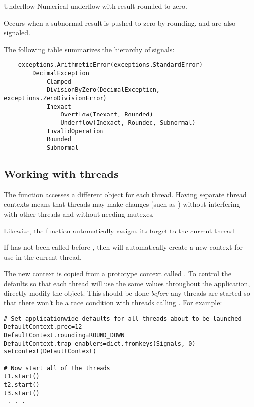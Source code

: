 \begin{classdesc*}{Underflow}
    Numerical underflow with result rounded to zero.

    Occurs when a subnormal result is pushed to zero by rounding.
     and  are also signaled.
\end{classdesc*}

The following table summarizes the hierarchy of signals:

\begin{verbatim}    
    exceptions.ArithmeticError(exceptions.StandardError)
        DecimalException
            Clamped
            DivisionByZero(DecimalException, exceptions.ZeroDivisionError)
            Inexact
                Overflow(Inexact, Rounded)
                Underflow(Inexact, Rounded, Subnormal)
            InvalidOperation
            Rounded
            Subnormal
\end{verbatim}            


\subsection{Working with threads \label{decimal-threads}}

The  function accesses a different 
object for each thread.  Having separate thread contexts means that threads
may make changes (such as ) without interfering with
other threads and without needing mutexes.

Likewise, the  function automatically assigns its target
to the current thread.

If  has not been called before ,
then  will automatically create a new context for use
in the current thread.

The new context is copied from a prototype context called .
To control the defaults so that each thread will use the same values
throughout the application, directly modify the  object.
This should be done \emph{before} any threads are started so that there won't
be a race condition with threads calling . For example:

\begin{verbatim}
# Set applicationwide defaults for all threads about to be launched
DefaultContext.prec=12
DefaultContext.rounding=ROUND_DOWN
DefaultContext.trap_enablers=dict.fromkeys(Signals, 0)
setcontext(DefaultContext)

# Now start all of the threads
t1.start()
t2.start()
t3.start()
 . . .
\end{verbatim}
 



